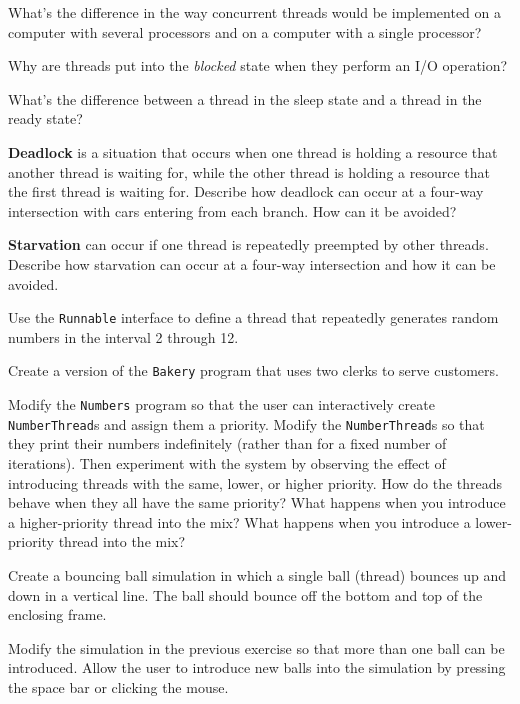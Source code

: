 \begin{EXRtwo}
\item  What's the difference in the way concurrent
threads would be implemented on a computer with several processors and
on a computer with a single processor?

\item  Why are threads put into the {\it blocked} state
when they perform an I/O operation?

\item  What's the difference between a thread in the
sleep state and a thread in the ready state?

\item  {\bf Deadlock} is a situation that occurs when one thread is
holding a resource that another thread is waiting for, while 
the other thread is holding a resource that the first
thread is waiting for. Describe how deadlock can occur at a 
four-way intersection with cars entering from each
branch. How can it be avoided?

\item  {\bf Starvation} can occur if one thread is repeatedly 
preempted by other threads. Describe how starvation
can occur at a four-way intersection and how it can be avoided.

\item  Use the {\tt Runnable} interface to define
a thread that repeatedly generates random numbers
in the interval 2 through 12.

\item  Create a version of the {\tt Bakery} program that
uses two clerks to serve customers.

\item  Modify the {\tt Numbers} program so that the user can
interactively create {\tt NumberThread}s and assign them a priority.
Modify the {\tt NumberThread}s so that they print their numbers
indefinitely (rather than for a fixed number of iterations). Then
experiment with the system by observing the effect of introducing
threads with the same, lower, or higher priority.  How do the threads
behave when they all have the same priority? What happens when you
introduce a higher-priority thread into the mix? What happens when you
introduce a lower-priority thread into the mix?

\item  Create a bouncing ball simulation in which
a single ball (thread) bounces up and down in a vertical line.  The
ball should bounce off the bottom and top of the enclosing frame.

\item  Modify the simulation in the previous exercise so
that more than one ball can be introduced.   Allow the user to
introduce new balls into the simulation by pressing the space bar or
clicking the mouse.


\end{EXRtwo}
